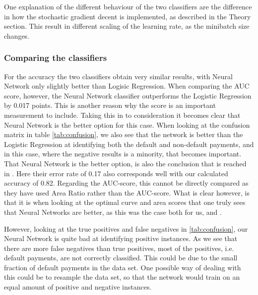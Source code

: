 One explanation of the different behaviour of the two classifiers are the difference in how the stochastic gradient decent is implemented, as described in the Theory section. This result in different scaling of the learning rate, as the minibatch size changes. 

\subsubsection{Comparing the classifiers}
For the accuracy the two classifiers obtain very similar results, with Neural Network only slightly better than Logisic Regression. When comparing the AUC score, however, the Neural Network classifier outperforms the Logistic Regression by 0.017 points. This is another reason why the score is an important measurement to include. Taking this in to consideration it becomes clear that Neural Network is the better option for this case. When looking at the confusion matrix in table \ref{tab:confusion}, we also see that the network is better than the Logistic Regression at identifying both the default and non-default payments, and in this case, where the negative results is a minority, that becomes important. That Neural Network is the better option, is also the conclusion that is reached in \cite{yeh2009UCI}. Here their error rate of 0.17 also corresponds well with our calculated accuracy of 0.82. Regarding the AUC-score, this cannot be directly compared as they have used Area Ratio rather than the AUC-score. What is clear however, is that it is when looking at the optimal curve and area scores that one truly sees that Neural Networks are better, as this was the case both for us, and \cite{yeh2009UCI}.

However, looking at the true positives and false negatives in \ref{tab:confusion}, our Neural Network is quite bad at identifying positive instances. As we see that there are more false negatives than true positives, most of the positives, i.e. default payments, are not correctly classified. This could be due to the small fraction of default payments in the data set. One possible way of dealing with this could be to resample the data set, so that the network would train on an equal amount of positive and negative instances.  

